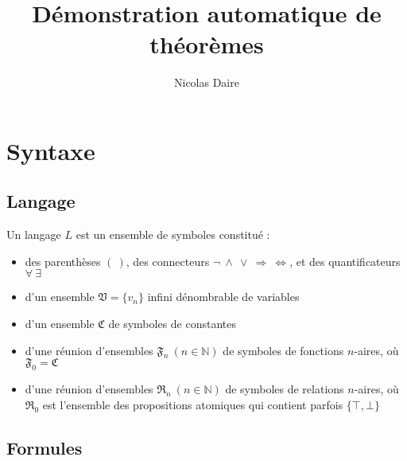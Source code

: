 \documentclass[9pt]{beamer}
\title{Démonstration automatique de théorèmes}
\author{Nicolas Daire}
\date{}
\begin{document}
\newcommand{\treel}{.7}
\newcommand{\treeh}{0.4}
\newcommand{\treehh}{0.8}
\newcommand{\trees}{1}

\begin{frame}
  \titlepage
\end{frame}

\begin{frame}
  \tableofcontents
\end{frame}

\theoremstyle{remark}
\newtheorem*{remark}{Remarque}

\section{Syntaxe}

\subsection{Langage}

\begin{frame}

\begin{definition}
  Un langage $L$ est un ensemble de symboles constitué :
  \begin{itemize}
  \item des parenthèses $(\ )$, des connecteurs $\neg\ \wedge\ \vee\ \Rightarrow\ \Leftrightarrow$, et des quantificateurs $\forall\ \exists$
  \item d'un ensemble $\mathfrak{V} = \{v_n\}$ infini dénombrable de variables
  \item d'un ensemble $\mathfrak{C}$ de symboles de constantes
  \item d'une réunion d'ensembles $\mathfrak{F}_n\ (n \in \mathbb{N})$ de symboles de fonctions $n$-aires, où $\mathfrak{F}_0 = \mathfrak{C}$
  \item d'une réunion d'ensembles $\mathfrak{R}_n\ (n \in \mathbb{N})$ de symboles de relations $n$-aires, où $\mathfrak{R}_0$ est l'ensemble des propositions atomiques qui contient parfois $\{\top,\bot\}$
  \end{itemize}
\end{definition}
\end{frame}

\subsection{Formules}
\end{document}
